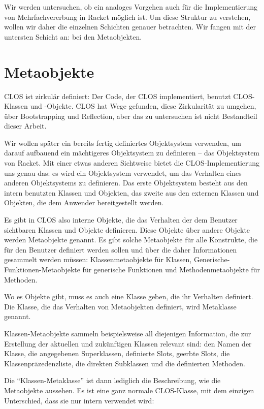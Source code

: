 Wir werden untersuchen, ob ein analoges Vorgehen auch für die Implementierung von Mehrfachvererbung in Racket möglich ist. Um diese Struktur zu verstehen, wollen wir daher die einzelnen Schichten genauer betrachten. Wir fangen mit der untersten Schicht an: bei den Metaobjekten.

\section{Metaobjekte}
CLOS ist zirkulär definiert: Der Code, der CLOS implementiert, benutzt CLOS-Klassen und -Objekte. CLOS hat Wege gefunden, diese Zirkularität zu umgehen, über Bootstrapping und Reflection, aber das zu untersuchen ist nicht Bestandteil dieser Arbeit. 

Wir wollen später ein bereits fertig definiertes Objektsystem verwenden, um darauf aufbauend ein mächtigeres Objektsystem zu definieren -- das Objektsystem von Racket. Mit einer etwas anderen Sichtweise bietet die CLOS-Implementierung uns genau das: es wird ein Objektsystem verwendet, um das Verhalten eines anderen Objektsystems zu definieren. Das erste Objektsystem besteht aus den intern benutzten Klassen und Objekten, das zweite aus den externen Klassen und Objekten, die dem Anwender bereitgestellt werden.

Es gibt in CLOS also interne Objekte, die das Verhalten der dem Benutzer sichtbaren Klassen und Objekte definieren. Diese Objekte über andere Objekte werden Metaobjekte genannt. Es gibt solche Metaobjekte für alle Konstrukte, die für den Benutzer definiert werden sollen und über die daher Informationen gesammelt werden müssen: Klassenmetaobjekte für Klassen, Generische-Funktionen-Metaobjekte für generische Funktionen und Methodenmetaobjekte für Methoden. 

Wo es Objekte gibt, muss es auch eine Klasse geben, die ihr Verhalten definiert. Die Klasse, die das Verhalten von Metaobjekten definiert, wird Metaklasse genannt. 

Klassen-Metaobjekte sammeln beispielsweise all diejenigen Information, die zur Erstellung der aktuellen und zukünftigen Klassen relevant sind: den Namen der Klasse, die angegebenen Superklassen, definierte Slots, geerbte Slots, die Klassenpräzedenzliste, die direkten Subklassen und die definierten Methoden. 

Die ``Klassen-Metaklasse'' ist dann lediglich die Beschreibung, wie die Metaobjekte aussehen. Es ist eine ganz normale CLOS-Klasse, mit dem einzigen Unterschied, dass sie nur intern verwendet wird:

